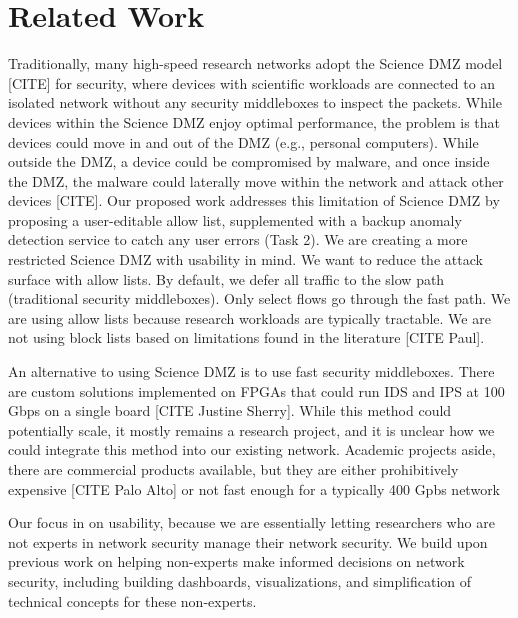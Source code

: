 \section{Related Work}

Traditionally, many high-speed research networks adopt the Science DMZ model [CITE] for security, where devices with scientific workloads are connected to an isolated network without any security middleboxes to inspect the packets. While devices within the Science DMZ enjoy optimal performance, the problem is that devices could move in and out of the DMZ (e.g., personal computers). While outside the DMZ, a device could be compromised by malware, and once inside the DMZ, the malware could laterally move within the network and attack other devices [CITE]. Our proposed work addresses this limitation of Science DMZ by proposing a user-editable allow list, supplemented with a backup anomaly detection service to catch any user errors (Task 2). We are creating a more restricted Science DMZ with usability in mind. We want to reduce the attack surface with allow lists. By default, we defer all traffic to the slow path (traditional security middleboxes). Only select flows go through the fast path. We are using allow lists because research workloads are typically tractable. We are not using block lists based on limitations found in the literature [CITE Paul].

An alternative to using Science DMZ is to use fast security middleboxes. There are custom solutions implemented on FPGAs that could run IDS and IPS at 100 Gbps on a single board [CITE Justine Sherry]. While this method could potentially scale, it mostly remains a research project, and it is unclear how we could integrate this method into our existing network. Academic projects aside, there are commercial products available, but they are either prohibitively expensive [CITE Palo Alto] or not fast enough for a typically 400 Gpbs network



Our focus in on usability, because we are essentially letting researchers who are not experts in network security manage their network security. We build upon previous work on helping non-experts make informed decisions on network security, including building dashboards, visualizations, and simplification of technical concepts for these non-experts.







